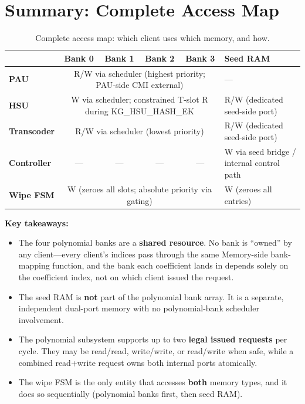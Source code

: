 \documentclass[11pt,letterpaper]{article}
\begin{document}
\section{Summary: Complete Access Map}
\label{sec:summary}

\begin{table}[H]
\centering
\caption{Complete access map: which client uses which memory, and how.}
\label{tab:access_map}
\begin{tabularx}{\textwidth}{@{}l c c c c X@{}}
\toprule
& \textbf{Bank 0} & \textbf{Bank 1} & \textbf{Bank 2} &
\textbf{Bank 3} & \textbf{Seed RAM} \\
\midrule
\textbf{PAU} &
\multicolumn{4}{c}{R/W via scheduler (highest priority; PAU-side CMI external)} &
--- \\
\textbf{HSU} &
\multicolumn{4}{c}{W via scheduler; constrained T-slot R during KG\_HSU\_HASH\_EK} &
R/W (dedicated seed-side port) \\
\textbf{Transcoder} &
\multicolumn{4}{c}{R/W via scheduler (lowest priority)} &
R/W (dedicated seed-side port) \\
\textbf{Controller} &
--- & --- & --- & --- &
W via seed bridge / internal control path \\
\textbf{Wipe FSM} &
\multicolumn{4}{c}{W (zeroes all slots; absolute priority via gating)} &
W (zeroes all entries) \\
\bottomrule
\end{tabularx}
\end{table}

\bigskip

\noindent\textbf{Key takeaways:}
\begin{itemize}
  \item The four polynomial banks are a \textbf{shared resource}. No
    bank is ``owned'' by any client---every client's indices pass through
    the same Memory-side bank-mapping function, and the bank each coefficient
    lands in depends solely on the coefficient index, not on which
    client issued the request.
  \item The seed RAM is \textbf{not} part of the polynomial bank array.
    It is a separate, independent dual-port memory with no polynomial-bank
    scheduler involvement.
  \item The polynomial subsystem supports up to two \textbf{legal issued
    requests} per cycle. They may be read/read, write/write, or read/write
    when safe, while a combined read+write request owns both internal ports
    atomically.
  \item The wipe FSM is the only entity that accesses \textbf{both}
    memory types, and it does so sequentially (polynomial banks first,
    then seed RAM).
\end{itemize}
\end{document}
